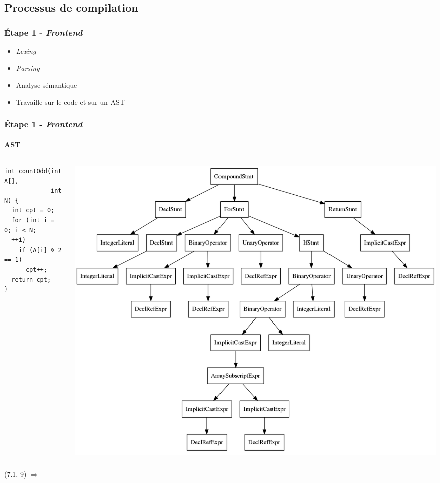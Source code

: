 \documentclass{beamer}
\begin{document}
\subsection{Processus de compilation}
\begin{frame}
\frametitle{Étape 1 - \textit{Frontend}}
\begin{itemize}
\item \textit{Lexing}
\item \textit{Parsing}
\item Analyse sémantique
\item Travaille sur le code et sur un AST
\end{itemize}
\end{frame}

\begin{frame}[fragile]
\frametitle{Étape 1 - \textit{Frontend}}
\framesubtitle{AST}
\begin{columns}
\begin{column}{0.5\textwidth}
\footnotesize{
\begin{lstlisting}
int countOdd(int A[],
             int N) {
  int cpt = 0;
  for (int i = 0; i < N;
  ++i)
    if (A[i] % 2 == 1)
      cpt++;
  return cpt;
}
\end{lstlisting}}
\end{column}
\begin{column}{0.5\textwidth}
\colorbox{white}{\includegraphics[scale=0.15]{AST.png}}
\end{column}
\end{columns}
\begin{textblock}{6}(7.1, 9)
\Huge{$\Rightarrow$}
\end{textblock}
\end{frame}
\end{document}
